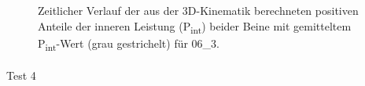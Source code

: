 \documentclass[
  letterpaper,
  DIV=11]{scrartcl}
\makeatletter
\let\oldparagraph\paragraph
\renewcommand{\paragraph}{
    \@ifstar
      \xxxParagraphStar
      \xxxParagraphNoStar
  }
\newcommand{\xxxParagraphStar}[1]{\oldparagraph*{#1}\mbox{}}
\newcommand{\xxxParagraphNoStar}[1]{\oldparagraph{#1}\mbox{}}
\makeatother
\begin{document}
\begin{figure}


\caption{\label{fig-PInt_Kinematik_06_3}Zeitlicher Verlauf der aus der
3D-Kinematik berechneten positiven Anteile der inneren Leistung
(P\textsubscript{int}) beider Beine mit gemitteltem
P\textsubscript{int}-Wert (grau gestrichelt) für 06\_3.}

\end{figure}%

\paragraph{Test 4}
\end{document}
